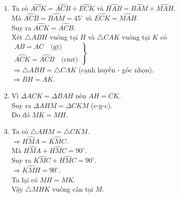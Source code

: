 \begin{vn}
{\begin{enumerate}
{
}
\item Ta có $\widehat{ACK} = \widehat{ACB} + \widehat{ECK}$ và $\widehat{HAB} = \widehat{BAM} + \widehat{MAH}$. \\
Mà $\widehat{ACB} = \widehat{BAM} = 45^\circ$ và $\widehat{ECK} = \widehat{MAH}$.\\
Suy ra $\widehat{ACK} = \widehat{ACB}$.\\	
Xét $\triangle ABH$ vuông tại $H$ và $\triangle CAK$ vuông tại $K$ có \\
$\left. 
\begin{array}{l} 
AB=AC \quad \text{(gt)}\\
\widehat{ACK} = \widehat{ACB} \quad \text{(cmt)}
\end{array} 
\right\}$\\
$\Rightarrow \triangle ABH =\triangle CAK$ (cạnh huyền - góc nhọn).\\
$\Rightarrow BH=AK$.
\item Vì $\Delta ACK=\Delta BAH$ nên $AH = CK$.\\
Suy ra $\Delta AHM=\Delta CKM$ (c-g-c).\\
Do đó $MK = MH$.
\item Ta có $\triangle AHM=\triangle CKM$.\\
$\Rightarrow \widehat{HMA} = \widehat{KMC}$.\\
Mà $\widehat{HMA} + \widehat{HMC} = 90 ^\circ$.\\
Suy ra $\widehat{KMC} + \widehat{HMC} = 90 ^\circ$.\\
$\Rightarrow \widehat{KMH}=90^{\circ}$.\\
Ta lại có $MH = MK$.\\
Vậy $\triangle MHK$ vuông cân tại $M$.
\end{enumerate}
}
\end{vn}

